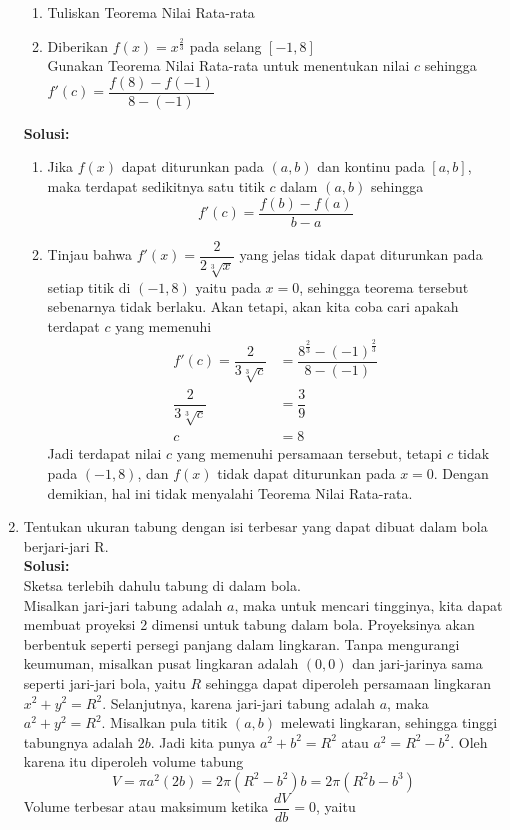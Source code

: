 \documentclass{article}
\begin{document}
\begin{enumerate}
\begin{enumerate}
		\item Tuliskan Teorema Nilai Rata-rata
		\item Diberikan $f(x)=x^{\frac{2}{3}}$ pada selang $[-1,8]$\\
		Gunakan Teorema Nilai Rata-rata untuk menentukan nilai $c$ sehingga $f'(c)=\dfrac{f(8)-f(-1)}{8-(-1)}$
	\end{enumerate}
	\textbf{Solusi:}
	\begin{enumerate}
		\item Jika $f(x)$ dapat diturunkan pada $(a,b)$ dan kontinu pada $[a,b]$, maka terdapat sedikitnya satu titik $c$ dalam $(a,b)$ sehingga $$ f'(c) = \dfrac{f(b)-f(a)}{b-a} $$
		\item Tinjau bahwa $f'(x)=\dfrac{2}{2\sqrt[3]{x}}$ yang jelas tidak dapat diturunkan pada setiap titik di $(-1,8)$ yaitu pada $x=0$, sehingga teorema tersebut sebenarnya tidak berlaku. Akan tetapi, akan kita coba cari apakah terdapat $c$ yang memenuhi
		\begin{align*}
		f'(c) = \dfrac{2}{3\sqrt[3]{c}} &= \dfrac{8^{\frac{2}{3}}-(-1)^{\frac{2}{3}}}{8-(-1)} \\
		\dfrac{2}{3\sqrt[3]{c}} &= \dfrac{3}{9} \\
		c &= 8
		\end{align*}
		Jadi terdapat nilai $c$ yang memenuhi persamaan tersebut, tetapi $c$ tidak pada $(-1,8)$, dan $f(x)$ tidak dapat diturunkan pada $x=0$. Dengan demikian, hal ini tidak menyalahi Teorema Nilai Rata-rata.
	\end{enumerate}
	\item Tentukan ukuran tabung dengan isi terbesar yang dapat dibuat dalam bola berjari-jari R.
	\\[0.1 cm] \textbf{Solusi:}\\
	Sketsa terlebih dahulu tabung di dalam bola. \\
	Misalkan jari-jari tabung adalah $a$, maka untuk mencari tingginya, kita dapat membuat proyeksi 2 dimensi untuk tabung dalam bola. Proyeksinya akan berbentuk seperti persegi panjang dalam lingkaran. Tanpa mengurangi keumuman, misalkan pusat lingkaran adalah $(0,0)$ dan jari-jarinya sama seperti jari-jari bola, yaitu $R$ sehingga dapat diperoleh persamaan lingkaran $x^2+y^2=R^2$. Selanjutnya, karena jari-jari tabung adalah $a$, maka $a^2+y^2=R^2$. Misalkan pula titik $(a,b)$ melewati lingkaran, sehingga tinggi tabungnya adalah $2b$. Jadi kita punya $a^2+b^2=R^2$ atau $a^2=R^2-b^2$. Oleh karena itu diperoleh volume tabung
	$$ V = \pi a^2(2b) = 2\pi (R^2-b^2)b = 2\pi(R^2b-b^3) $$
	 Volume terbesar atau maksimum ketika $\dfrac{dV}{db}=0$, yaitu

\end{enumerate}
\end{document}

